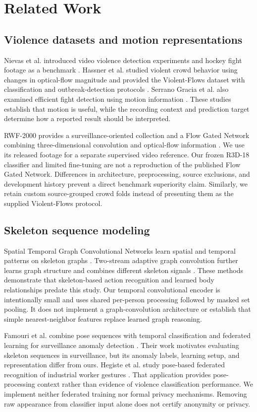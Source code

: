 \section{Related Work}
\subsection{Violence datasets and motion representations}
Nievas et al. introduced video violence detection experiments and hockey fight footage as a benchmark \cite{nievas2011}. Hassner et al. studied violent crowd behavior using changes in optical-flow magnitude and provided the Violent-Flows dataset with classification and outbreak-detection protocols \cite{hassner2012}. Serrano Gracia et al. also examined efficient fight detection using motion information \cite{serrano2015}. These studies establish that motion is useful, while the recording context and prediction target determine how a reported result should be interpreted.

RWF-2000 provides a surveillance-oriented collection and a Flow Gated Network combining three-dimensional convolution and optical-flow information \cite{cheng2020}. We use its released footage for a separate supervised video reference. Our frozen R3D-18 classifier and limited fine-tuning are not a reproduction of the published Flow Gated Network. Differences in architecture, preprocessing, source exclusions, and development history prevent a direct benchmark superiority claim. Similarly, we retain custom source-grouped crowd folds instead of presenting them as the supplied Violent-Flows protocol.

\subsection{Skeleton sequence modeling}
Spatial Temporal Graph Convolutional Networks learn spatial and temporal patterns on skeleton graphs \cite{yan2018}. Two-stream adaptive graph convolution further learns graph structure and combines different skeleton signals \cite{shi2019}. These methods demonstrate that skeleton-based action recognition and learned body relationships predate this study. Our temporal convolutional encoder is intentionally small and uses shared per-person processing followed by masked set pooling. It does not implement a graph-convolution architecture or establish that simple nearest-neighbor features replace learned graph reasoning.

Famouri et al. combine pose sequences with temporal classification and federated learning for surveillance anomaly detection \cite{famouri2025}. Their work motivates evaluating skeleton sequences in surveillance, but its anomaly labels, learning setup, and representation differ from ours. Hegiste et al. study pose-based federated recognition of industrial worker gestures \cite{hegiste2025}. That application provides pose-processing context rather than evidence of violence classification performance. We implement neither federated training nor formal privacy mechanisms. Removing raw appearance from classifier input alone does not certify anonymity or privacy.

